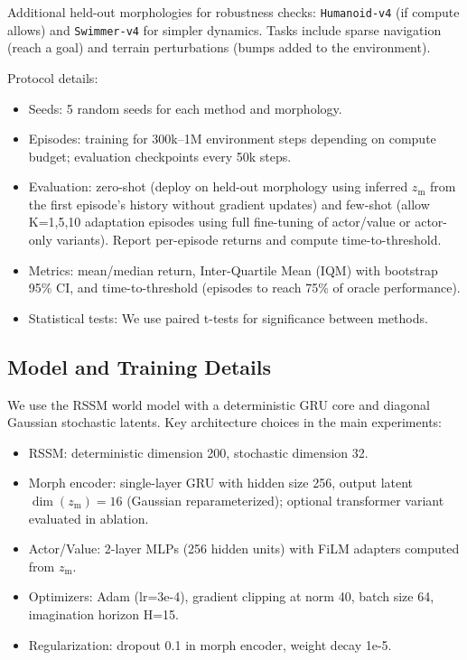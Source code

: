 \documentclass{article}
\begin{document}
Additional held-out morphologies for robustness checks: \texttt{Humanoid-v4} (if compute allows) and \texttt{Swimmer-v4} for simpler dynamics. Tasks include sparse navigation (reach a goal) and terrain perturbations (bumps added to the environment).

Protocol details:
\begin{itemize}
  \item Seeds: 5 random seeds for each method and morphology.
  \item Episodes: training for 300k–1M environment steps depending on compute budget; evaluation checkpoints every 50k steps.
  \item Evaluation: zero-shot (deploy on held-out morphology using inferred $z_{\mathrm{m}}$ from the first episode's history without gradient updates) and few-shot (allow K=1,5,10 adaptation episodes using full fine-tuning of actor/value or actor-only variants). Report per-episode returns and compute time-to-threshold.
  \item Metrics: mean/median return, Inter-Quartile Mean (IQM) with bootstrap 95\% CI, and time-to-threshold (episodes to reach 75\% of oracle performance).
  \item Statistical tests: We use paired t-tests for significance between methods.
\end{itemize}

\subsection{Model and Training Details}
We use the RSSM world model with a deterministic GRU core and diagonal Gaussian stochastic latents. Key architecture choices in the main experiments:
\begin{itemize}
  \item RSSM: deterministic dimension 200, stochastic dimension 32.
  \item Morph encoder: single-layer GRU with hidden size 256, output latent $\dim(z_{\mathrm{m}})=16$ (Gaussian reparameterized); optional transformer variant evaluated in ablation.
  \item Actor/Value: 2-layer MLPs (256 hidden units) with FiLM adapters computed from $z_{\mathrm{m}}$.
  \item Optimizers: Adam (lr=3e-4), gradient clipping at norm 40, batch size 64, imagination horizon H=15.
  \item Regularization: dropout 0.1 in morph encoder, weight decay 1e-5.
\end{itemize}
\end{document}
